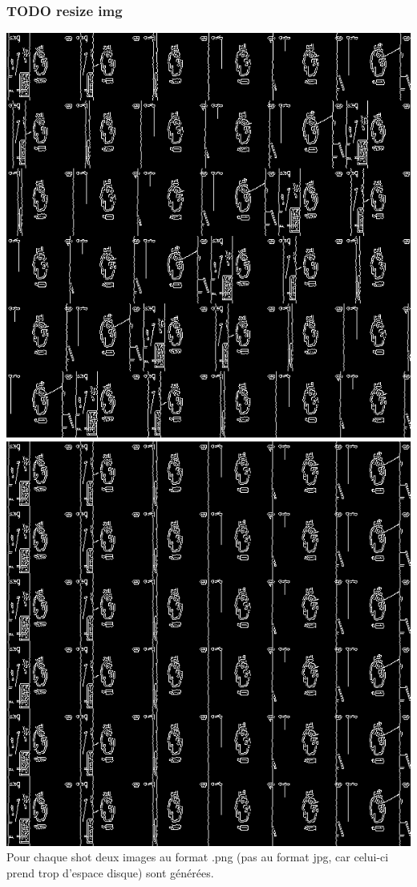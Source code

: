 \documentclass[11pt]{article}
\begin{document}
\subsubsection{{\bfseries\sffamily TODO} resize img}
\label{sec-7-2-1}
\includegraphics[width=.9\linewidth]{mosaique1.png}
\includegraphics[width=.9\linewidth]{mosaique2.png}
Pour chaque shot deux images au format .png (pas au format jpg, car celui-ci prend trop d'espace disque) sont générées.
\end{document}
